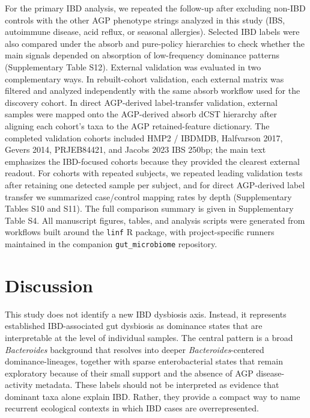\documentclass[
  11pt,
]{article}
\newcommand{\taxon}[1]{\emph{#1}}
\begin{document}
For the primary IBD analysis, we repeated the follow-up after excluding
non-IBD controls with the other AGP phenotype strings analyzed in this
study (IBS, autoimmune disease, acid reflux, or seasonal allergies).
Selected IBD labels were also compared under the absorb and pure-policy
hierarchies to check whether the main signals depended on absorption of
low-frequency dominance patterns (Supplementary Table S12). External validation
was evaluated in two complementary ways. In rebuilt-cohort validation,
each external matrix was filtered and analyzed independently with the
same absorb workflow used for the discovery cohort. In direct
AGP-derived label-transfer validation, external samples were mapped onto
the AGP-derived absorb dCST hierarchy after aligning each cohort's taxa to the AGP
retained-feature dictionary. The completed validation cohorts included
HMP2 / IBDMDB, Halfvarson 2017, Gevers 2014, PRJEB84421, and Jacobs 2023
IBS 250bp; the main text emphasizes the IBD-focused cohorts because they
provided the clearest external readout. For cohorts with repeated
subjects, we repeated leading validation tests after retaining one
detected sample per subject, and for direct AGP-derived label transfer
we summarized case/control mapping rates by depth (Supplementary Tables
S10 and S11). The full comparison
summary is given in Supplementary Table S4. All manuscript figures,
tables, and analysis scripts were generated from workflows built around
the \texttt{linf} R package, with project-specific runners maintained in
the companion \texttt{gut\_microbiome} repository.

\section{Discussion}\label{general-discussion}

This study does not identify a new IBD dysbiosis axis. Instead, it
represents established IBD-associated gut dysbiosis as dominance states
that are interpretable at the level of individual samples. The central
pattern is a broad \taxon{Bacteroides} background that resolves into
deeper \taxon{Bacteroides}-centered dominance-lineages, together with
sparse enterobacterial states that remain exploratory because of their
small support and the absence of AGP disease-activity metadata. These
labels should not be interpreted as evidence that dominant taxa alone
explain IBD. Rather, they provide a compact way to name recurrent
ecological contexts in which IBD cases are overrepresented.
\end{document}
